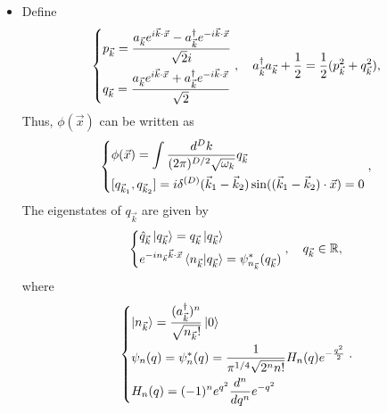 \documentclass[10pt, a4paper]{article}
\numberwithin{equation}{section}
\begin{document}
\begin{itemize}
		\item Define
		\begin{equation}
			\begin{dcases}
				p_{\vec{k}} = \frac{a_{\vec{k}} e^{i \vec{k} \cdot \vec{x}} - a^\dag_{\vec{k}} e^{- i \vec{k} \cdot \vec{x}}}{\sqrt{2} i} \\
				q_{\vec{k}} = \frac{a_{\vec{k}} e^{i \vec{k} \cdot \vec{x}} + a^\dag_{\vec{k}} e^{- i \vec{k} \cdot \vec{x}}}{\sqrt{2}}
			\end{dcases}, \quad a^\dag_{\vec{k}} a_{\vec{k}} + \frac{1}{2} = \frac{1}{2} (p_{\vec{k}}^2 + q_{\vec{k}}^2),
		\end{equation}
		Thus, $\phi(\vec{x})$ can be written as
		\begin{equation}
			\begin{dcases}
				\phi(\vec{x}) = \int \frac{d^D k}{(2 \pi)^{D / 2} \sqrt{\omega_k}} q_{\vec{k}} \\
				[q_{\vec{k}_1}, q_{\vec{k}_2}] = i \delta^{(D)}(\vec{k}_1 - \vec{k}_2) \sin((\vec{k}_1 - \vec{k}_2) \cdot \vec{x}) = 0
			\end{dcases},
		\end{equation}
		The eigenstates of $q_{\vec{k}}$ are given by
		\begin{equation}
			\begin{dcases}
				\hat{q}_{\vec{k}} \ket{q_{\vec{k}}} = q_{\vec{k}} \ket{q_{\vec{k}}} \\
				e^{- i n_{\vec{k}} \vec{k} \cdot \vec{x}} \braket{n_{\vec{k}} | q_{\vec{k}}} = \psi^*_{n_{\vec{k}}}(q_{\vec{k}})
			\end{dcases}, \quad q_{\vec{k}} \in \mathbb{R},
		\end{equation}
		where
		\begin{equation}
			\begin{dcases}
				\ket{n_{\vec{k}}} = \frac{(a^\dag_{\vec{k}})^n}{\sqrt{n_{\vec{k}}!}} \ket{0} \\
				\psi_n(q) = \psi^*_n(q) = \frac{1}{\pi^{1 / 4} \sqrt{2^n n!}} H_n(q) e^{- \frac{q^2}{2}} \\
				H_n(q) = (- 1)^n e^{q^2} \frac{d^n}{dq^n} e^{- q^2}
			\end{dcases}.
		\end{equation}
		

\end{itemize}
\end{document}
